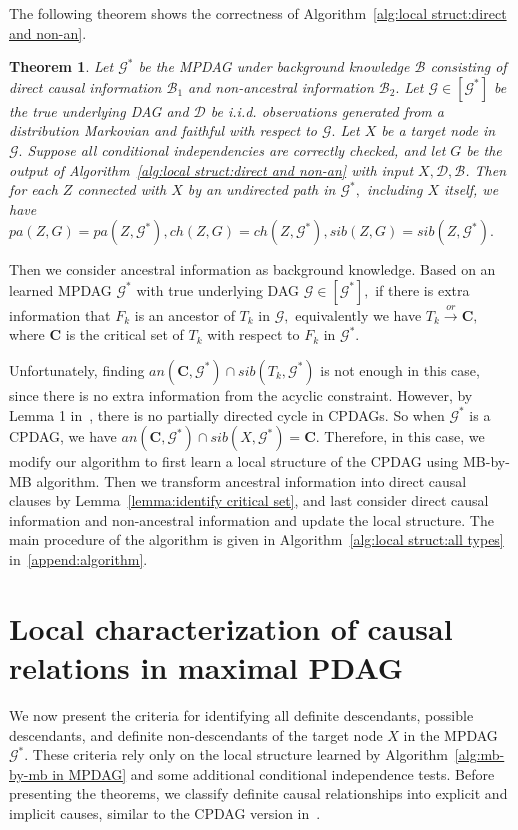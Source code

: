 \documentclass{article}
\newtheorem{theorem}{Theorem}
\begin{document}
The following theorem shows the correctness of Algorithm~\ref{alg:local struct:direct and non-an}.

\begin{theorem}
\label{thm:correct alg non-an}
Let $\mathcal{G}^*$ be the MPDAG under background knowledge $\mathcal{B}$ consisting of direct causal information $\mathcal{B}_1$ and non-ancestral information $\mathcal{B}_2.$ Let $\mathcal{G}\in [\mathcal{G}^*]$ be the true underlying DAG and $\mathcal{D}$ be i.i.d. observations generated from a distribution Markovian and faithful with respect to $\mathcal{G}.$ Let $X$ be a target node in $\mathcal{G}.$ Suppose all conditional independencies are correctly checked, and let $G$ be the output of Algorithm~\ref{alg:local struct:direct and non-an} with input $X,\mathcal{D},\mathcal{B}$.
Then for each $Z$ connected with $X$ by an undirected path in $\mathcal{G}^*,$ including $X$ itself, we have $pa(Z,G)=pa(Z,\mathcal{G}^*),ch(Z,G)=ch(Z,\mathcal{G}^*),sib(Z,G)=sib(Z,\mathcal{G}^*).$
\end{theorem}

Then we consider ancestral information as background knowledge. Based on an learned MPDAG $\mathcal{G}^*$ with true underlying DAG $\mathcal{G}\in [\mathcal{G}^*],$ if there is extra information that $F_k$ is an ancestor of $T_k$ in $\mathcal{G},$ equivalently we have $T_k\overset{or}{\to}\mathbf{C},$ where $\mathbf{C}$ is the critical set of $T_k$ with respect to $F_k$ in $\mathcal{G}^*.$ 

Unfortunately, finding $an(\mathbf{C},\mathcal{G}^*)\cap sib(T_k,\mathcal{G}^*)$ is not enough in this case, since there is no extra information from the acyclic constraint. However, by Lemma 1 in~\citet{meek1995causal}, there is no partially directed cycle in CPDAGs. So when $\mathcal{G}^*$ is a CPDAG, we have $an(\mathbf{C},\mathcal{G}^*) \cap sib(X,\mathcal{G}^*)=\mathbf{C}.$ Therefore, in this case, we modify our algorithm to first learn a local structure of the CPDAG using MB-by-MB algorithm. Then we transform ancestral information into direct causal clauses by Lemma~\ref{lemma:identify critical set}, and last consider direct causal information and non-ancestral information and update the local structure. The main procedure of the algorithm is given in Algorithm~\ref{alg:local struct:all types} in~\ref{append:algorithm}.

\section{Local characterization of causal relations in maximal PDAG}
\label{sec:local theorems}
We now present the criteria for identifying all definite descendants, possible descendants, and definite non-descendants of the target node $X$ in the MPDAG $\mathcal{G}^*.$ These criteria rely only on the local structure learned by Algorithm~\ref{alg:mb-by-mb in MPDAG} and some additional conditional independence tests. Before presenting the theorems, we classify definite causal relationships into explicit and implicit causes, similar to the CPDAG version in~\citep{fang2022local}.
\end{document}
